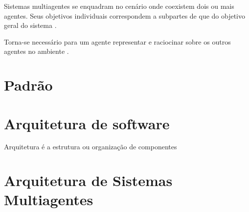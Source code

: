 Sistemas multiagentes se enquadram no cenário onde coexistem dois ou mais agentes. Seus objetivos individuais  correspondem a subpartes de que do objetivo geral do sistema \cite{mcarthur2007multi}.

Torna-se necessário para um agente representar e raciocinar sobre os outros agentes no ambiente \cite[pág. 887]{van2008handbook}. 


\section{Padrão}

\section{Arquitetura de software}

Arquitetura é a estrutura ou organização de componentes 

\section{Arquitetura de Sistemas Multiagentes}



